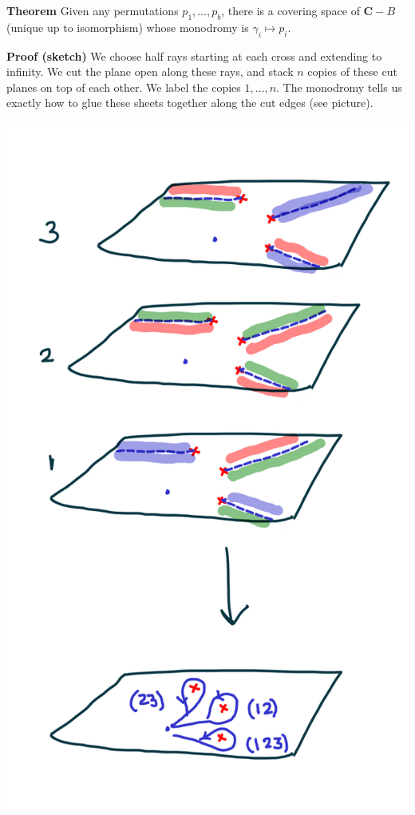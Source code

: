 \documentclass[11pt]{article}
\begin{document}
\textbf{\textbf{Theorem}} Given any permutations \(p_1, \dots, p_{b}\), there is a covering space of \(\mathbf{C}-B\) (unique up to isomorphism) whose monodromy is \(\gamma_{i} \mapsto p_i\).

\textbf{\textbf{Proof (sketch)}} 
We choose half rays starting at each cross and extending to infinity.
We cut the plane open along these rays, and stack \(n\) copies of these cut planes on top of each other.
We label the copies \(1,\dots, n\).
The monodromy tells us exactly how to glue these sheets together along the cut edges (see picture).

\begin{center}
\includegraphics[width=.9\linewidth]{assets/Course_notes/2023-03-24_15-09-45_screenshot.png}
\end{center}
\end{document}
